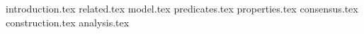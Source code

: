 {introduction.tex}
{related.tex}
{model.tex}
{predicates.tex}
{properties.tex}
{consensus.tex}
{construction.tex}
{analysis.tex}

